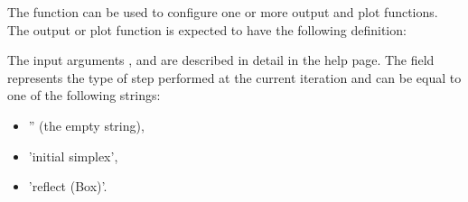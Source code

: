 \begin{Details}

The  function can be used to configure one or more output and
plot functions.
The output or plot function is expected to have the following definition:


The input arguments ,  and  are
described in detail in the  help page. The
 field represents the type of step performed at
the current iteration and can be equal to one of the following strings:
\begin{itemize}

\item '' (the empty string),
\item 'initial simplex',
\item 'reflect (Box)'.

\end{itemize}

\end{Details}
%
